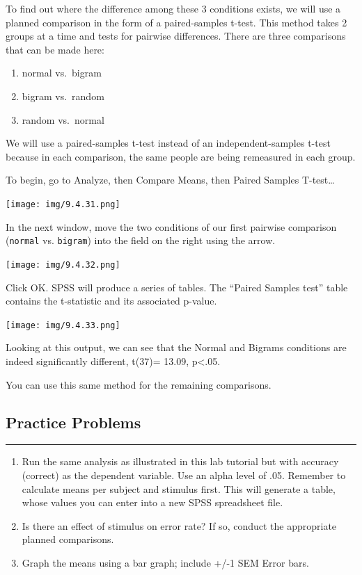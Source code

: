 \documentclass[]{book}
\providecommand{\tightlist}{%
  \setlength{\itemsep}{0pt}\setlength{\parskip}{0pt}}
\begin{document}
To find out where the difference among these 3 conditions exists, we
will use a planned comparison in the form of a paired-samples t-test.
This method takes 2 groups at a time and tests for pairwise differences.
There are three comparisons that can be made here:

\begin{enumerate}
\def\labelenumi{\arabic{enumi}.}
\tightlist
\item
  normal vs.~bigram
\item
  bigram vs.~random
\item
  random vs.~normal
\end{enumerate}

We will use a paired-samples t-test instead of an independent-samples
t-test because in each comparison, the same people are being remeasured
in each group.

To begin, go to {Analyze}, then {Compare Means}, then {Paired Samples
T-test\ldots{}}

\texttt{[image: img/9.4.31.png]}

In the next window, move the two conditions of our first pairwise
comparison (\texttt{normal} vs. \texttt{bigram}) into the field on the
right using the arrow.

\texttt{[image: img/9.4.32.png]}

Click {OK}. SPSS will produce a series of tables. The ``Paired Samples
test'' table contains the t-statistic and its associated p-value.

\texttt{[image: img/9.4.33.png]}

Looking at this output, we can see that the Normal and Bigrams
conditions are indeed significantly different, t(37)= 13.09,
p\textless{}.05.

You can use this same method for the remaining comparisons.

\subsection{Practice Problems}\label{practice-problems-9}

\begin{center}\rule{0.5\linewidth}{0.5pt}\end{center}

\begin{enumerate}
\def\labelenumi{\arabic{enumi}.}
\item
  Run the same analysis as illustrated in this lab tutorial but with
  accuracy (correct) as the dependent variable. Use an alpha level of
  .05. Remember to calculate means per subject and stimulus first. This
  will generate a table, whose values you can enter into a new SPSS
  spreadsheet file.
\item
  Is there an effect of stimulus on error rate? If so, conduct the
  appropriate planned comparisons.
\item
  Graph the means using a bar graph; include +/-1 SEM Error bars.
\end{enumerate}
\end{document}
